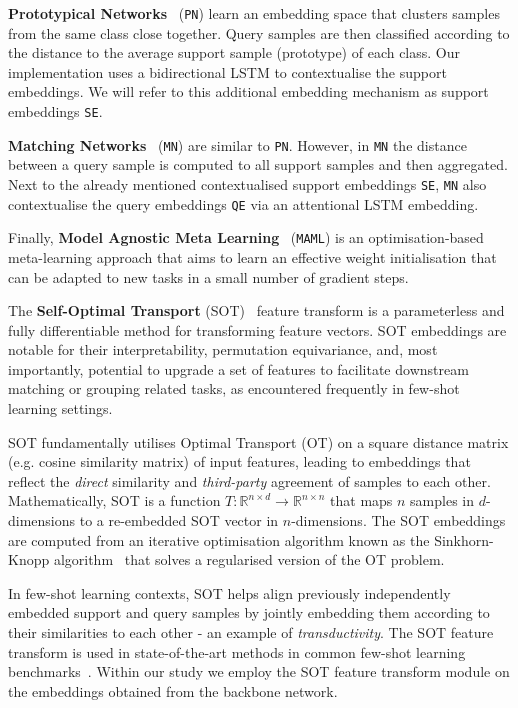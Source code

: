 \textbf{Prototypical Networks}~\cite{protonet} (\texttt{PN}) learn an embedding space that clusters samples from the same class close together. Query samples are then classified according to the distance to the average support sample (prototype) of each class.  Our implementation uses a bidirectional LSTM to contextualise the support embeddings. We will refer to this additional embedding mechanism as support embeddings \texttt{SE}.

\textbf{Matching Networks}~\cite{matchingnet} (\texttt{MN}) are similar to \texttt{PN}. However, in \texttt{MN} the distance between a query sample is computed to all support samples and then aggregated. Next to the already mentioned contextualised support embeddings \texttt{SE}, \texttt{MN} also contextualise the query embeddings \texttt{QE} via an attentional LSTM embedding.

Finally, \textbf{Model Agnostic Meta Learning}~\cite{maml} (\texttt{MAML}) is an optimisation-based meta-learning approach that aims to learn an effective weight initialisation that can be adapted to new tasks in a small number of gradient steps.


The \textbf{Self-Optimal Transport} (SOT)~\cite{sot} feature transform is a parameterless and fully differentiable method for transforming feature vectors. 
SOT embeddings are notable for their interpretability, permutation equivariance, and, most importantly, potential to upgrade a set of features to facilitate 
downstream matching or grouping related tasks, as encountered frequently in few-shot learning settings.

SOT fundamentally utilises Optimal Transport (OT) on a square distance matrix (e.g. cosine similarity matrix) of input features, 
leading to embeddings that reflect the \textit{direct} similarity and \textit{third-party} agreement of samples to each other. 
Mathematically, SOT is a function \(T: \mathbb{R}^{n \times d} \rightarrow \mathbb{R}^{n \times n}\) that maps \(n\) samples in \(d\)-dimensions to a 
re-embedded SOT vector in \(n\)-dimensions. The SOT embeddings are computed from an iterative optimisation algorithm known as the Sinkhorn-Knopp 
algorithm~\cite{sinkhorn-knopp} that solves a regularised version of the OT problem.

In few-shot learning contexts, SOT helps align previously independently embedded support and query samples by jointly embedding them according to their similarities to each other - an example of \textit{transductivity}. 
The SOT feature transform is used in state-of-the-art methods in common few-shot learning benchmarks~\cite{sot}. Within our study we employ the SOT feature transform module on the embeddings obtained from the backbone network.

